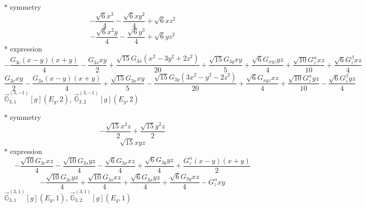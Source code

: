 \documentclass[fleqn,8pt]{jsarticle}
\begin{document}
\noindent\quad ** symmetry
\begin{dmath*}
- \frac{\sqrt{6} x^{3}}{4} - \frac{\sqrt{6} x y^{2}}{4} + \sqrt{6} x z^{2}
\end{dmath*}
\begin{dmath*}
- \frac{\sqrt{6} x^{2} y}{4} - \frac{\sqrt{6} y^{3}}{4} + \sqrt{6} y z^{2}
\end{dmath*}
\noindent\quad ** expression
\begin{dmath*}
- \frac{G_{3c} \left(x - y\right) \left(x + y\right)}{4} - \frac{G_{3s} x y}{2} + \frac{\sqrt{15} G_{3x} \left(x^{2} - 3 y^{2} + 2 z^{2}\right)}{20} + \frac{\sqrt{15} G_{3y} x y}{5} + \frac{\sqrt{6} G_{xyz} y z}{4} + \frac{\sqrt{10} G_{z}^{\alpha} x z}{10} + \frac{\sqrt{6} G_{z}^{\beta} x z}{4}
\end{dmath*}
\begin{dmath*}
\frac{G_{3c} x y}{2} - \frac{G_{3s} \left(x - y\right) \left(x + y\right)}{4} + \frac{\sqrt{15} G_{3x} x y}{5} - \frac{\sqrt{15} G_{3y} \left(3 x^{2} - y^{2} - 2 z^{2}\right)}{20} + \frac{\sqrt{6} G_{xyz} x z}{4} + \frac{\sqrt{10} G_{z}^{\alpha} y z}{10} - \frac{\sqrt{6} G_{z}^{\beta} y z}{4}
\end{dmath*}
\noindent\quad $\vec{\mathbb{G}}_{3,1}^{(3,-1)}[g](E_{g},2)$, $\vec{\mathbb{G}}_{3,2}^{(3,-1)}[g](E_{g},2)$

\noindent\quad ** symmetry
\begin{dmath*}
- \frac{\sqrt{15} x^{2} z}{2} + \frac{\sqrt{15} y^{2} z}{2}
\end{dmath*}
\begin{dmath*}
\sqrt{15} x y z
\end{dmath*}
\noindent\quad ** expression
\begin{dmath*}
- \frac{\sqrt{10} G_{3c} x z}{4} - \frac{\sqrt{10} G_{3s} y z}{4} - \frac{\sqrt{6} G_{3x} x z}{4} + \frac{\sqrt{6} G_{3y} y z}{4} + \frac{G_{z}^{\alpha} \left(x - y\right) \left(x + y\right)}{2}
\end{dmath*}
\begin{dmath*}
- \frac{\sqrt{10} G_{3c} y z}{4} + \frac{\sqrt{10} G_{3s} x z}{4} + \frac{\sqrt{6} G_{3x} y z}{4} + \frac{\sqrt{6} G_{3y} x z}{4} - G_{z}^{\alpha} x y
\end{dmath*}
\noindent\quad $\vec{\mathbb{G}}_{3,1}^{(3,1)}[g](E_{g},1)$, $\vec{\mathbb{G}}_{3,2}^{(3,1)}[g](E_{g},1)$
\end{document}

